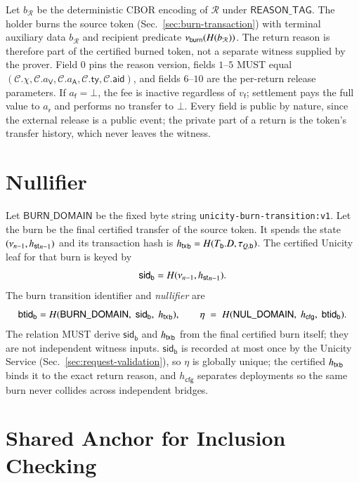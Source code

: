 Let $b_\mathcal{R}$ be the deterministic CBOR encoding of $\mathcal{R}$ under $\mathsf{REASON\_TAG}$. The holder burns the source token (Sec.~\ref{sec:burn-transaction}) with terminal auxiliary data $b_\mathcal{R}$ and recipient predicate $\nu_\mathsf{burn}(H(b_\mathcal{R}))$. The return reason is therefore part of the certified burned token, not a separate witness supplied by the prover. Field $0$ pins the reason version, fields $1$--$5$ MUST equal $(\mathcal{C}.\chi,\mathcal{C}.a_\mathsf{V},\mathcal{C}.a_\mathsf{A},\mathcal{C}.\mathsf{ty},\mathcal{C}.\mathsf{aid})$, and fields $6$--$10$ are the per-return release parameters. If $a_\mathsf{f}=\bot$, the fee is inactive regardless of $v_\mathsf{f}$; settlement pays the full value to $a_\mathsf{r}$ and performs no transfer to $\bot$. Every field is public by nature, since the external release is a public event; the private part of a return is the token's transfer history, which never leaves the witness.

\section{Nullifier}\label{app:bridging-nullifier}

Let $\mathsf{BURN\_DOMAIN}$ be the fixed byte string \texttt{unicity-burn-transition:v1}. Let the burn be the final certified transfer of the source token. It spends the state $(\nu_{n-1},{h_\mathsf{st}}_{n-1})$ and its transaction hash is ${h_\mathsf{tx}}_\mathsf{b}=H(T_\mathsf{b}.D,\tau_{Q,\mathsf b})$. The certified Unicity leaf for that burn is keyed by
\[
\mathsf{sid}_\mathsf{b} = H(\nu_{n-1},{h_\mathsf{st}}_{n-1}).
\]
The burn transition identifier and \emph{nullifier} are
\[
\mathsf{btid}_\mathsf{b} = H(\mathsf{BURN\_DOMAIN},\; \mathsf{sid}_\mathsf{b},\; {h_\mathsf{tx}}_\mathsf{b}),
\qquad
\eta \;=\; H(\mathsf{NUL\_DOMAIN},\; h_\mathsf{cfg},\; \mathsf{btid}_\mathsf{b}).
\]
The relation MUST derive $\mathsf{sid}_\mathsf{b}$ and ${h_\mathsf{tx}}_\mathsf{b}$ from the final certified burn itself; they are not independent witness inputs. $\mathsf{sid}_\mathsf{b}$ is recorded at most once by the Unicity Service (Sec.~\ref{sec:request-validation}), so $\eta$ is globally unique; the certified ${h_\mathsf{tx}}_\mathsf{b}$ binds it to the exact return reason, and $h_\mathsf{cfg}$ separates deployments so the same burn never collides across independent bridges.

\section{Shared Anchor for Inclusion Checking}\label{app:bridging-anchor}

